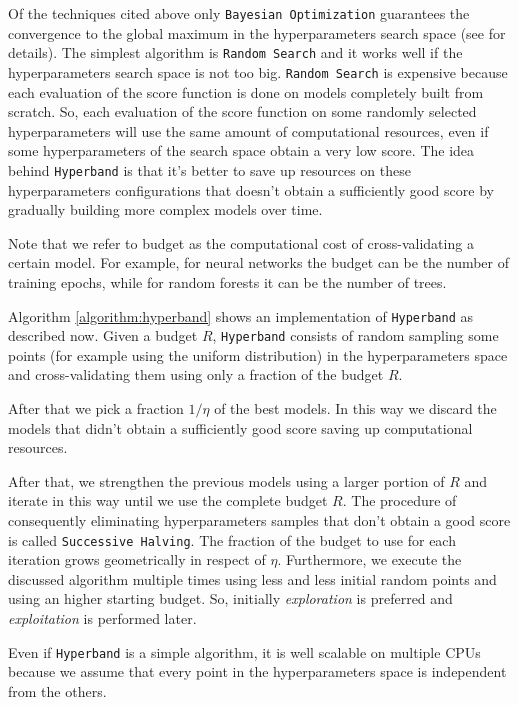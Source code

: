 \documentclass[11pt, a4paper]{article}
\begin{document}
  Of the techniques cited above only \texttt{Bayesian Optimization} guarantees the convergence to the global maximum in the hyperparameters search space (see \cite{bayesianoptimization} for details).
  The simplest algorithm is \texttt{Random Search} and it works well if the hyperparameters search space is not too big.
  \texttt{Random Search} is expensive because each evaluation of the score function is done on models completely built from scratch.
  So, each evaluation of the score function on some randomly selected hyperparameters will use the same amount of computational resources, even if some hyperparameters of the search space obtain a very low score.
  The idea behind \texttt{Hyperband} is that it's better to save up resources on these hyperparameters configurations that doesn't obtain a sufficiently good score by gradually building more complex models over time.
  
  Note that we refer to budget as the computational cost of cross-validating a certain model.
  For example, for neural networks the budget can be the number of training epochs, while for random forests it can be the number of trees.

  Algorithm \ref{algorithm:hyperband} shows an implementation of \texttt{Hyperband} as described now.
  Given a budget $R$, \texttt{Hyperband} consists of random sampling some points (for example using the uniform distribution) in the hyperparameters space and cross-validating them using only a fraction of the budget $R$.

  After that we pick a fraction $1/\eta$ of the best models.
  In this way we discard the models that didn't obtain a sufficiently good score saving up computational resources.

  After that, we strengthen the previous models using a larger portion of $R$ and iterate in this way until we use the complete budget $R$.
  The procedure of consequently eliminating hyperparameters samples that don't obtain a good score is called \texttt{Successive Halving}.
  The fraction of the budget to use for each iteration grows geometrically in respect of $\eta$.
  Furthermore, we execute the discussed algorithm multiple times using less and less initial random points and using an higher starting budget.
  So, initially \textit{exploration} is preferred and \textit{exploitation} is performed later.

  Even if \texttt{Hyperband} is a simple algorithm, it is well scalable on multiple CPUs because we assume that every point in the hyperparameters space is independent from the others.
\end{document}
